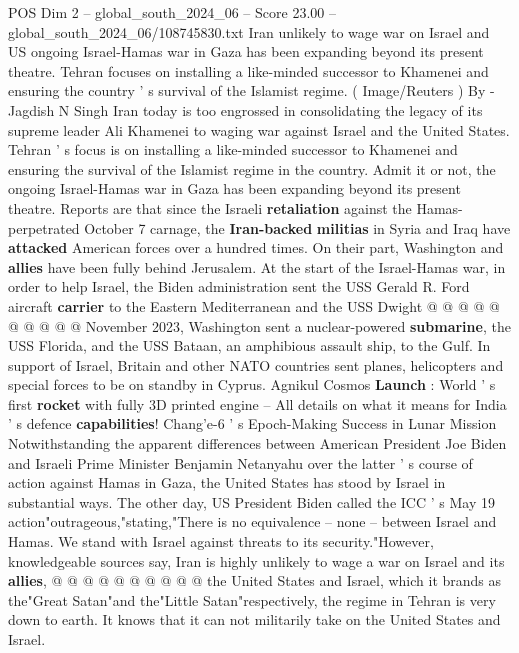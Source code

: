 \begin{textsample}{POS Dim 2 – global\_south\_2024\_06 – Score 23.00 – global\_south\_2024\_06/108745830.txt}  \label{ex:f2_pos_115}
Iran unlikely to wage war on Israel and US ongoing Israel-Hamas war in Gaza has been expanding beyond its present theatre.
Tehran focuses on installing a like-minded successor to Khamenei and ensuring the country ' s survival of the Islamist regime. ( Image/Reuters ) By -Jagdish N Singh Iran today is too engrossed in consolidating the legacy of its supreme leader Ali Khamenei to waging war against Israel and the United States.
Tehran ' s focus is on installing a like-minded successor to Khamenei and ensuring the survival of the Islamist regime in the country.
Admit it or not, the ongoing Israel-Hamas war in Gaza has been expanding beyond its present theatre.
Reports are that since the Israeli \textbf{retaliation} against the Hamas-perpetrated October 7 carnage, the \textbf{Iran-backed} \textbf{militias} in Syria and Iraq have \textbf{attacked} American forces over a hundred times.
On their part, Washington and \textbf{allies} have been fully behind Jerusalem.
At the start of the Israel-Hamas war, in order to help Israel, the Biden administration sent the USS Gerald R.
Ford aircraft \textbf{carrier} to the Eastern Mediterranean and the USS Dwight @ @ @ @ @ @ @ @ @ @ November 2023, Washington sent a nuclear-powered \textbf{submarine}, the USS Florida, and the USS Bataan, an amphibious assault ship, to the Gulf.
In support of Israel, Britain and other NATO countries sent planes, helicopters and special forces to be on standby in Cyprus.
Agnikul Cosmos \textbf{Launch} : World ' s first \textbf{rocket} with fully 3D printed engine -- All details on what it means for India ' s defence \textbf{capabilities}!
Chang'e-6 ' s Epoch-Making Success in Lunar Mission Notwithstanding the apparent differences between American President Joe Biden and Israeli Prime Minister Benjamin Netanyahu over the latter ' s course of action against Hamas in Gaza, the United States has stood by Israel in substantial ways.
The other day, US President Biden called the ICC ' s May 19 action"outrageous,"stating,"There is no equivalence -- none -- between Israel and Hamas.
We stand with Israel against threats to its security."However, knowledgeable sources say, Iran is highly unlikely to wage a war on Israel and its \textbf{allies}, @ @ @ @ @ @ @ @ @ @ the United States and Israel, which it brands as the"Great Satan"and the"Little Satan"respectively, the regime in Tehran is very down to earth.
It knows that it can not militarily take on the United States and Israel.

\end{textsample}
